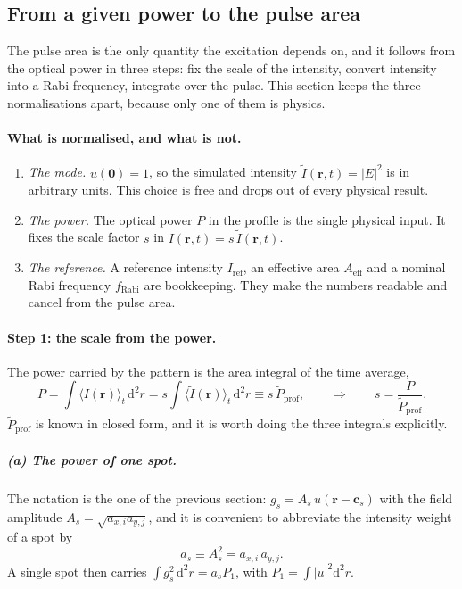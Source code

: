 \subsection{From a given power to the pulse area}

The pulse area is the only quantity the excitation depends on, and it follows
from the optical power in three steps: fix the scale of the intensity, convert
intensity into a Rabi frequency, integrate over the pulse. This section keeps
the three normalisations apart, because only one of them is physics.

\paragraph{What is normalised, and what is not.}
\begin{enumerate}
\item \emph{The mode.} $u(\mathbf 0)=1$, so the simulated intensity
      $\tilde I(\mathbf r,t)=|E|^2$ is in arbitrary units. This choice is free
      and drops out of every physical result.
\item \emph{The power.} The optical power $P$ in the profile is the single
      physical input. It fixes the scale factor $s$ in
      $I(\mathbf r,t)=s\,\tilde I(\mathbf r,t)$.
\item \emph{The reference.} A reference intensity $I_\mathrm{ref}$, an
      effective area $A_\mathrm{eff}$ and a nominal Rabi frequency
      $f_\mathrm{Rabi}$ are bookkeeping. They make the numbers readable and
      cancel from the pulse area.
\end{enumerate}

\paragraph{Step 1: the scale from the power.}
The power carried by the pattern is the area integral of the time average,
\begin{equation}
P=\int\!\langle I(\mathbf r)\rangle_t\,\mathrm d^2r
 =s\int\!\langle\tilde I(\mathbf r)\rangle_t\,\mathrm d^2r
 \equiv s\,\tilde P_\mathrm{prof},
\qquad\Longrightarrow\qquad
s=\frac{P}{\tilde P_\mathrm{prof}} .
\end{equation}
$\tilde P_\mathrm{prof}$ is known in closed form, and it is worth doing the
three integrals explicitly.

\subparagraph{(a) The power of one spot.}
The notation is the one of the previous section: $g_s=A_s\,u(\mathbf r-\mathbf
c_s)$ with the field amplitude $A_s=\sqrt{a_{x,i}a_{y,j}}$, and it is
convenient to abbreviate the intensity weight of a spot by
\begin{equation}
a_s\equiv A_s^2=a_{x,i}\,a_{y,j} .
\end{equation}
A single spot then carries $\int g_s^2\,\mathrm d^2r=a_sP_1$, with
$P_1=\int|u|^2\mathrm d^2r$.

